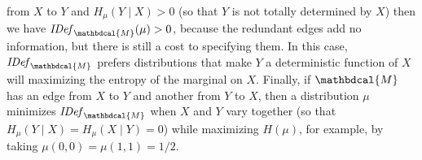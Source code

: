 \documentclass[letterpaper]{article} %
\theoremstyle{plain}
\theoremstyle{definition}
\theoremstyle{remark}
\newcommand{\dg}[1]{\mathbdcal{#1}}
\newcommand{\IDef}[1]{\mathit{IDef}_{#1}}
\begin{document}
 from $X$ to $Y$
 and $H_{\mu}(Y \mid X) > 0$ 
(so that $Y$ is not totally determined by $X$)
then we have $\IDef{\dg M}(\mu) > 0$, because the redundant edges add no
information, but there is still a cost to specifying them.
In this case, $\IDef{\dg M}$ prefers distributions that make $Y$ a
deterministic function of $X$ will maximizing the entropy of the
marginal on $X$.
Finally, if ${\dg M}$ has an edge from $X$ to $Y$ and another from $Y$
to $X$, then 
a distribution $\mu$ minimizes
$\IDef{\dg M}$ when 
$X$ and $Y$  vary together
(so that $H_\mu(Y \mid X) = H_\mu(X \mid Y) = 0$) while
maximizing $H(\mu)$, for example, by taking $\mu(0,0) = \mu(1,1) = 1/2$.
\end{document}
